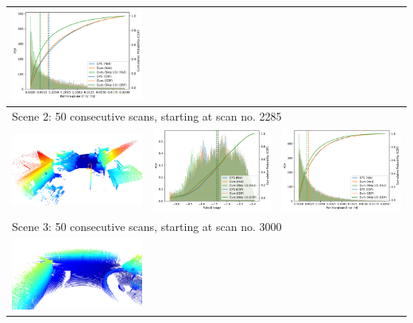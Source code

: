 \begin{table}[h]
{\begin{tabular}{ccc}
            \includegraphics[width=0.31\linewidth]{images/map_eval/p2plane_gps_ours_skip-2285--50.pdf}                                                 \\
            \hline
            \multicolumn{3}{l}{Scene 2: 50 consecutive scans, starting at scan no. 2285}                                                               \\
            \hline
            \includegraphics[width=0.3\linewidth]{images/map_eval/viz-3000--50.png}                    &
            \includegraphics[width=0.31\linewidth]{images/map_eval/entropy_gps_ours_skip-3000--50.pdf} &
            \includegraphics[width=0.31\linewidth]{images/map_eval/p2plane_gps_ours_skip-3000--50.pdf}                                                 \\
            \hline
            \multicolumn{3}{l}{Scene 3: 50 consecutive scans, starting at scan no. 3000}                                                               \\
            \hline
            \includegraphics[width=0.3\linewidth]{images/map_eval/viz-200--50.png}                     &

\end{tabular}}
\end{table}
